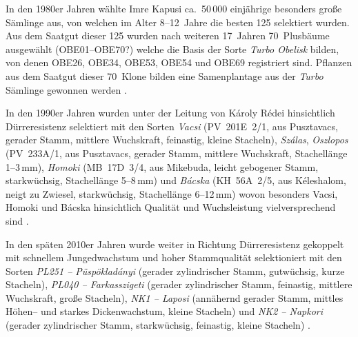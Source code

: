 \documentclass[twocolumn]{scrartcl}
\begin{document}
In den 1980er Jahren wählte Imre Kapusi ca.\ 50\,000 einjährige
besonders große Sämlinge aus, von welchen im Alter 8--12~Jahre die
besten 125 selektiert wurden. Aus dem Saatgut dieser 125 wurden nach
weiteren 17~Jahren 70~Plusbäume ausgewählt (OBE01--OBE70?) welche die
Basis der Sorte \emph{Turbo Obelisk} bilden, von denen OBE26, OBE34,
OBE53, OBE54 und OBE69 registriert sind.
Pflanzen aus dem Saatgut dieser 70~Klone
bilden eine Samenplantage aus der \emph{Turbo} Sämlinge gewonnen
werden \citep{nemeth2022robinie}.

In den 1990er Jahren wurden unter der Leitung von Károly Rédei
hinsichtlich Dürreresistenz selektiert mit den Sorten \emph{Vacsi}
(PV~201E~2/1, aus Pusztavacs, gerader Stamm, mittlere Wuchskraft,
feinastig, kleine Stacheln), \emph{Szálas}, \emph{Oszlopos}
(PV~233A/1, aus Pusztavacs, gerader Stamm, mittlere Wuchskraft,
Stachellänge 1--3\,mm), \emph{Homoki} (MB~17D~3/4, aus Mikebuda, leicht
gebogener Stamm, starkwüchsig, Stachellänge 5--8\,mm) und
\emph{Bácska} (KH~56A~2/5, aus Kéleshalom, neigt zu Zwiesel,
starkwüchsig, Stachellänge 6--12\,mm) wovon besonders Vacsi, Homoki
und Bácska hinsichtlich Qualität und Wuchsleistung vielversprechend
sind \citep{keserue2021robinie,abri2023robinieUngarn,abri2024dis}.

In den späten 2010er Jahren wurde weiter in Richtung Dürreresistenz
gekoppelt mit schnellem Jungedwachstum und hoher Stammqualität
selektioniert mit den Sorten \emph{PL251 -- Püspökladányi} (gerader
zylindrischer Stamm, gutwüchsig, kurze Stacheln), \emph{PL040 --
Farkasszigeti} (gerader zylindrischer Stamm, feinastig, mittlere
Wuchskraft, große Stacheln), \emph{NK1 -- Laposi} (annähernd gerader
Stamm, mittles Höhen-- und starkes Dickenwachstum, kleine Stacheln) und
\emph{NK2 -- Napkori} (gerader zylindrischer Stamm, starkwüchsig,
feinastig, kleine Stacheln) \citep{abri2023robinieUngarn,abri2024dis}.
\end{document}
